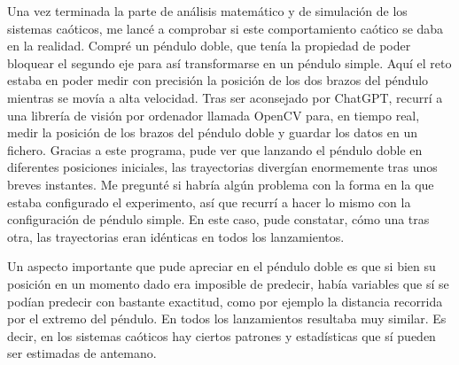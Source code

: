 \documentclass[
  10pt,
  a4paper,
  DIV=11,
  numbers=noendperiod,
  open=any]{scrreprt}
\numberwithin{equation}{chapter}
\numberwithin{equation}{section}
\renewcommand{\[}{\begin{equation}}
\renewcommand{\]}{\end{equation}}
\begin{document}
Una vez terminada la parte de análisis matemático y de simulación de los
sistemas caóticos, me lancé a comprobar si este comportamiento caótico
se daba en la realidad. Compré un péndulo doble, que tenía la propiedad
de poder bloquear el segundo eje para así transformarse en un péndulo
simple. Aquí el reto estaba en poder medir con precisión la posición de
los dos brazos del péndulo mientras se movía a alta velocidad. Tras ser
aconsejado por ChatGPT, recurrí a una librería de visión por ordenador
llamada OpenCV para, en tiempo real, medir la posición de los brazos del
péndulo doble y guardar los datos en un fichero. Gracias a este
programa, pude ver que lanzando el péndulo doble en diferentes
posiciones iniciales, las trayectorias divergían enormemente tras unos
breves instantes. Me pregunté si habría algún problema con la forma en
la que estaba configurado el experimento, así que recurrí a hacer lo
mismo con la configuración de péndulo simple. En este caso, pude
constatar, cómo una tras otra, las trayectorias eran idénticas en todos
los lanzamientos.

Un aspecto importante que pude apreciar en el péndulo doble es que si
bien su posición en un momento dado era imposible de predecir, había
variables que sí se podían predecir con bastante exactitud, como por
ejemplo la distancia recorrida por el extremo del péndulo. En todos los
lanzamientos resultaba muy similar. Es decir, en los sistemas caóticos
hay ciertos patrones y estadísticas que sí pueden ser estimadas de
antemano.
\end{document}
